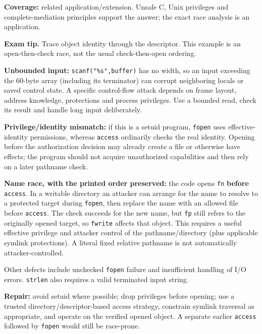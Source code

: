 \documentclass[11pt,a4paper]{article}
\begin{document}
\textbf{Coverage:} related application/\allowbreak{}extension. Unsafe C,\allowbreak{} Unix privileges and complete-mediation principles support the answer; the exact race analysis is an application.



{\color{ForestGreen}\textbf{Exam tip.} Trace object identity through the descriptor. This example is an open-then-check race,\allowbreak{} not the usual check-then-open ordering.}


\textbf{Unbounded input:} \texttt{scanf("\%s",\allowbreak{}buffer)} has no width,\allowbreak{} so an input exceeding the 60-byte array (including its terminator) can corrupt neighboring locals or saved control state. A specific control-flow attack depends on frame layout,\allowbreak{} address knowledge,\allowbreak{} protections and process privileges. Use a bounded read,\allowbreak{} check its result and handle long input deliberately.


\textbf{Privilege/\allowbreak{}identity mismatch:} if this is a setuid program,\allowbreak{} \texttt{fopen} uses effective-identity permissions,\allowbreak{} whereas \texttt{access} ordinarily checks the real identity. Opening before the authorization decision may already create a file or otherwise have effects; the program should not acquire unauthorized capabilities and then rely on a later pathname check.


\textbf{Name race,\allowbreak{} with the printed order preserved:} the code opens \texttt{fn} \textbf{before} \texttt{access}. In a writable directory an attacker can arrange for the name to resolve to a protected target during \texttt{fopen},\allowbreak{} then replace the name with an allowed file before \texttt{access}. The check succeeds for the new name,\allowbreak{} but \texttt{fp} still refers to the originally opened target,\allowbreak{} so \texttt{fwrite} affects that object. This requires a useful effective privilege and attacker control of the pathname/\allowbreak{}directory (plus applicable symlink protections). A literal fixed relative pathname is not automatically attacker-controlled.


Other defects include unchecked \texttt{fopen} failure and insufficient handling of I/\allowbreak{}O errors. \texttt{strlen} also requires a valid terminated input string.


\textbf{Repair:} avoid setuid where possible; drop privileges before opening; use a trusted directory/\allowbreak{}descriptor-based access strategy,\allowbreak{} constrain symlink traversal as appropriate,\allowbreak{} and operate on the verified opened object. A separate earlier \texttt{access} followed by \texttt{fopen} would still be race-prone.
\end{document}

